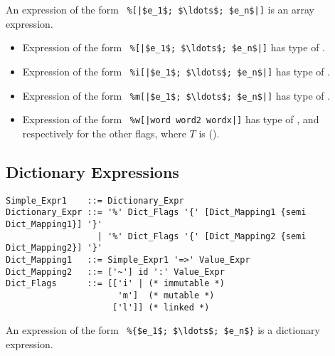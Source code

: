 An expression of the form ~\lstinline!%[|$e_1$; $\ldots$; $e_n$|]! is an array expression. 

\begin{itemize}
  \item Expression of the form ~\lstinline!%[|$e_1$; $\ldots$; $e_n$|]!
    has type of . 
  \item Expression of the form ~\lstinline!%i[|$e_1$; $\ldots$; $e_n$|]!
    has type of . 
  \item Expression of the form ~\lstinline!%m[|$e_1$; $\ldots$; $e_n$|]!
    has type of .
  \item Expression of the form ~\lstinline!%w[|word word2 wordx|]!
    has type of , and respectively for the other flags, where $T$ is  (). 
\end{itemize}






\subsection{Dictionary Expressions}
\label{sec:dict-expressions}

\syntax\begin{lstlisting}
Simple_Expr1    ::= Dictionary_Expr
Dictionary_Expr ::= '%' Dict_Flags '{' [Dict_Mapping1 {semi Dict_Mapping1}] '}'
                  | '%' Dict_Flags '{' [Dict_Mapping2 {semi Dict_Mapping2}] '}'
Dict_Mapping1   ::= Simple_Expr1 '=>' Value_Expr
Dict_Mapping2   ::= ['~'] id ':' Value_Expr
Dict_Flags      ::= [['i' | (* immutable *)
                      'm']  (* mutable *)
                     ['l']] (* linked *)
\end{lstlisting}

An expression of the form ~\lstinline!%{$e_1$; $\ldots$; $e_n$}! is a dictionary expression. 

